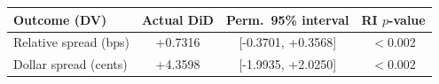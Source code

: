 \begin{tabular}{lccc}
\toprule
Outcome (DV) & Actual DiD & Perm.\ 95\% interval & RI $p$-value \\
\midrule
Relative spread (bps) & +0.7316 & [-0.3701, +0.3568] & $<$0.002 \\
Dollar spread (cents) & +4.3598 & [-1.9935, +2.0250] & $<$0.002 \\
\bottomrule
\end{tabular}